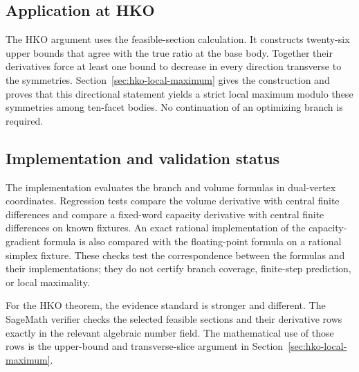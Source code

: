 \subsection{Application at HKO}
\label{subsec:first-order-hko-upper-functions}

The HKO argument uses the feasible-section calculation. It constructs
twenty-six upper bounds that agree with the true ratio at the base body.
Together their derivatives force at least one bound to decrease in every
direction transverse to the symmetries. Section~\ref{sec:hko-local-maximum}
gives the construction and proves that this directional statement yields
a strict local maximum modulo these symmetries among ten-facet bodies.
No continuation of an optimizing branch is
required.

\subsection{Implementation and validation status}
\label{subsec:first-order-validation}

The implementation evaluates the branch and volume formulas in dual-vertex
coordinates.  Regression tests compare the volume derivative with central
finite differences and compare a fixed-word capacity derivative with central
finite differences on known fixtures.  An exact rational implementation of
the capacity-gradient formula is also compared with the floating-point formula
on a rational simplex fixture.  These checks test the correspondence between
the formulas and their implementations; they do not certify branch coverage,
finite-step prediction, or local maximality.

For the HKO theorem, the evidence standard is stronger and different.  The
SageMath verifier checks the selected feasible sections and their derivative
rows exactly in the relevant algebraic number field.  The mathematical use of
those rows is the upper-bound and transverse-slice argument in
Section~\ref{sec:hko-local-maximum}.

